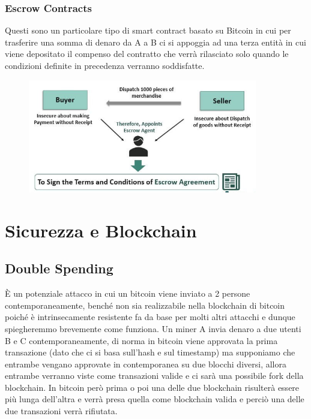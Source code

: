 \subsubsection{Escrow Contracts}

Questi sono un particolare tipo di smart contract basato su Bitcoin in cui per
trasferire una somma di denaro da A a B ci si appoggia ad una terza entità in
cui viene depositato il compenso del contratto che verrà rilasciato solo quando
le condizioni definite in precedenza verranno soddisfatte.

\begin{figure}[H]
    \centering
    \includegraphics[width=10cm, keepaspectratio]{capitoli/bitcoin/imgs/escort.png}
\end{figure}


\section{Sicurezza e Blockchain}

\subsection{Double Spending}

È un potenziale attacco in cui un bitcoin viene inviato a 2 persone
contemporaneamente, benché non sia realizzabile nella blockchain di bitcoin
poiché è intrinsecamente resistente fa da base per molti altri attacchi e dunque
spiegheremmo brevemente come funziona. Un miner A invia denaro a due utenti B e
C contemporaneamente, di norma in bitcoin viene approvata la prima transazione
(dato che ci si basa sull'hash e sul timestamp) ma supponiamo che entrambe
vengano approvate in contemporanea su due blocchi diversi, allora entrambe
verranno viste come transazioni valide e ci sarà una possibile fork della
blockchain. In bitcoin però prima o poi una delle due blockchain
risulterà essere più lunga dell'altra e verrà presa quella come blockchain
valida e perciò una delle due transazioni verrà rifiutata.

